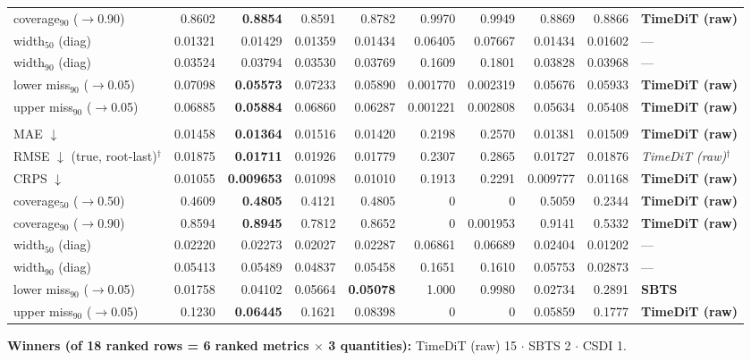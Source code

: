 \documentclass[11pt,a4paper]{article}
\begin{document}
\begin{landscape}
\begin{center}
\begin{tabular}{lrrrrrrrrl}
coverage$_{90}$ ($\to$0.90) & 0.8602 & \textbf{0.8854} & 0.8591 & 0.8782 & 0.9970 & 0.9949 & 0.8869 & 0.8866 & \textbf{TimeDiT (raw)} \\
width$_{50}$ (diag) & 0.01321 & 0.01429 & 0.01359 & 0.01434 & 0.06405 & 0.07667 & 0.01434 & 0.01602 & --- \\
width$_{90}$ (diag) & 0.03524 & 0.03794 & 0.03530 & 0.03769 & 0.1609 & 0.1801 & 0.03828 & 0.03968 & --- \\
lower miss$_{90}$ ($\to$0.05) & 0.07098 & \textbf{0.05573} & 0.07233 & 0.05890 & 0.001770 & 0.002319 & 0.05676 & 0.05933 & \textbf{TimeDiT (raw)} \\
upper miss$_{90}$ ($\to$0.05) & 0.06885 & \textbf{0.05884} & 0.06860 & 0.06287 & 0.001221 & 0.002808 & 0.05634 & 0.05408 & \textbf{TimeDiT (raw)} \\
\addlinespace
\multicolumn{10}{l}{\textbf{rv ($M$ scalar)}} \\
MAE $\downarrow$ & 0.01458 & \textbf{0.01364} & 0.01516 & 0.01420 & 0.2198 & 0.2570 & 0.01381 & 0.01509 & \textbf{TimeDiT (raw)} \\
RMSE $\downarrow$ (true, root-last)$^{\dagger}$ & 0.01875 & \textbf{0.01711} & 0.01926 & 0.01779 & 0.2307 & 0.2865 & 0.01727 & 0.01876 & \textit{TimeDiT (raw)}$^{\dagger}$ \\
CRPS $\downarrow$ & 0.01055 & \textbf{0.009653} & 0.01098 & 0.01010 & 0.1913 & 0.2291 & 0.009777 & 0.01168 & \textbf{TimeDiT (raw)} \\
coverage$_{50}$ ($\to$0.50) & 0.4609 & \textbf{0.4805} & 0.4121 & 0.4805 & 0 & 0 & 0.5059 & 0.2344 & \textbf{TimeDiT (raw)} \\
coverage$_{90}$ ($\to$0.90) & 0.8594 & \textbf{0.8945} & 0.7812 & 0.8652 & 0 & 0.001953 & 0.9141 & 0.5332 & \textbf{TimeDiT (raw)} \\
width$_{50}$ (diag) & 0.02220 & 0.02273 & 0.02027 & 0.02287 & 0.06861 & 0.06689 & 0.02404 & 0.01202 & --- \\
width$_{90}$ (diag) & 0.05413 & 0.05489 & 0.04837 & 0.05458 & 0.1651 & 0.1610 & 0.05753 & 0.02873 & --- \\
lower miss$_{90}$ ($\to$0.05) & 0.01758 & 0.04102 & 0.05664 & \textbf{0.05078} & 1.000 & 0.9980 & 0.02734 & 0.2891 & \textbf{SBTS} \\
upper miss$_{90}$ ($\to$0.05) & 0.1230 & \textbf{0.06445} & 0.1621 & 0.08398 & 0 & 0 & 0.05859 & 0.1777 & \textbf{TimeDiT (raw)} \\
\bottomrule
\end{tabular}
\end{center}
\noindent\textbf{Winners (of 18 ranked rows = 6 ranked metrics $\times$ 3 quantities):} TimeDiT (raw) 15 $\cdot$ SBTS 2 $\cdot$ CSDI 1.
\end{landscape}
\end{document}

